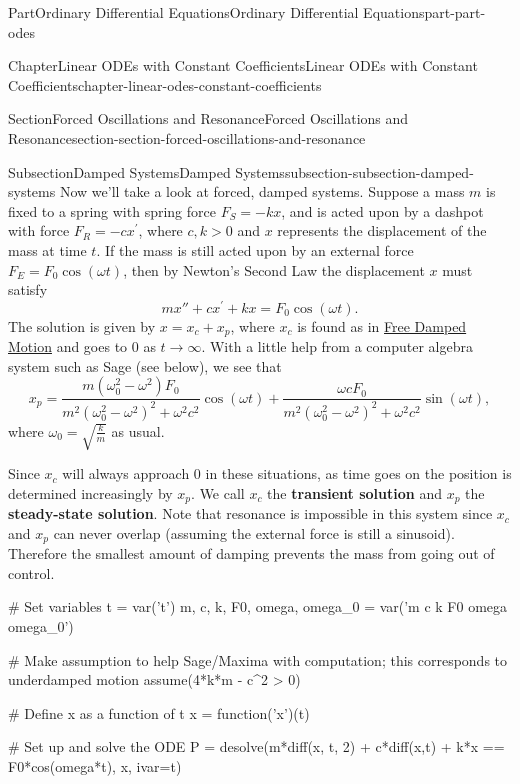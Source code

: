 \documentclass[twoside,10pt,]{book}
\newcommand{\terminology}[1]{\textbf{#1}}
\numberwithin{equation}{part}
\newcommand{\gt}{>}
\begin{document}
\begin{partptx}{Part}{Ordinary Differential Equations}{}{Ordinary Differential Equations}{}{}{part-part-odes}
\begin{chapterptx}{Chapter}{Linear ODEs with Constant Coefficients}{}{Linear ODEs with Constant Coefficients}{}{}{chapter-linear-odes-constant-coefficients}
\begin{sectionptx}{Section}{Forced Oscillations and Resonance}{}{Forced Oscillations and Resonance}{}{}{section-section-forced-oscillations-and-resonance}
%
%
\typeout{************************************************}
\typeout{************************************************}
%
\begin{subsectionptx}{Subsection}{Damped Systems}{}{Damped Systems}{}{}{subsection-subsection-damped-systems}
Now we'll take a look at forced, damped systems. Suppose a mass \(m\) is fixed to a spring with spring force \(F_{S} = -kx\), and is acted upon by a dashpot with force \(F_{R} = -cx^\prime\), where \(c,k \gt 0\) and \(x\) represents the displacement of the mass at time \(t\). If the mass is still acted upon by an external force \(F_{E} = F_{0}\cos(\omega t)\), then by Newton's Second Law the displacement \(x\) must satisfy%
\begin{equation*}
mx'' + cx^\prime + kx = F_{0}\cos(\omega t).
\end{equation*}
The solution is given by \(x = x_{c} + x_{p}\), where \(x_{c}\) is found as in \hyperref[subsection-subsection-free-damped-motion]{Free Damped Motion} and goes to \(0\) as \(t\to\infty\). With a little help from a computer algebra system such as Sage (see below), we see that%
\begin{equation*}
x_{p} = \frac{m(\omega_{0}^{2} - \omega^{2})F_{0}}{m^{2}(\omega_{0}^{2} - \omega^{2})^{2} + \omega^{2}c^{2}}\cos(\omega t) + \frac{\omega c F_{0}}{m^{2}(\omega_{0}^{2} - \omega^{2})^{2} + \omega^{2}c^{2}}\sin(\omega t),
\end{equation*}
where \(\omega_{0} = \sqrt{\frac{k}{m}}\) as usual.%
\par
Since \(x_{c}\) will always approach \(0\) in these situations, as time goes on the position is determined increasingly by \(x_{p}\). We call \(x_{c}\) the \terminology{transient solution} and \(x_{p}\) the \terminology{steady-state solution}. Note that resonance is impossible in this system since \(x_{c}\) and \(x_{p}\) can never overlap (assuming the external force is still a sinusoid). Therefore the smallest amount of damping prevents the mass from going out of control.%
\begin{sageinput}
# Set variables
t = var('t')
m, c, k, F0, omega, omega_0 = var('m c k F0 omega omega_0')

# Make assumption to help Sage/Maxima with computation; this corresponds to underdamped motion
assume(4*k*m - c^2 > 0)

# Define x as a function of t
x = function('x')(t)

# Set up and solve the ODE
P = desolve(m*diff(x, t, 2) + c*diff(x,t) + k*x == F0*cos(omega*t), x, ivar=t)


\end{sageinput}
\end{subsectionptx}
\end{sectionptx}
\end{chapterptx}
\end{partptx}
\end{document}
